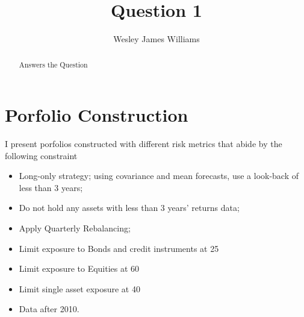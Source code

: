 \documentclass[12pt,preprint, authoryear]{elsarticle}
\numberwithin{equation}{section}
\numberwithin{figure}{section}
\numberwithin{table}{section}
\begin{document}
\begin{frontmatter}  %

\title{Question 1}





\author[Add1]{Wesley James Williams}





\address[Add1]{Stellenbosch University, South Africa}


\begin{abstract}
\small{
Answers the Question
}
\end{abstract}

\vspace{1cm}





\vspace{0.5cm}

\end{frontmatter}

\setcounter{footnote}{0}



\pagestyle{fancy}
\chead{}
\rhead{}
\lfoot{}
\lhead{}
\cfoot{}


\headsep 35pt %




\hypertarget{porfolio-construction}{%
\section{Porfolio Construction}\label{porfolio-construction}}

I present porfolios constructed with different risk metrics that abide
by the following constraint

\begin{itemize}
\item Long-only strategy;
\itemWhen using covariance and mean forecasts, use a look-back of less than 3 years;
\item Do not hold any assets with less than 3 years’ returns data;
\item Apply Quarterly Rebalancing;
\item Limit exposure to Bonds and credit instruments at 25%
\item Limit exposure to Equities at 60%
\item Limit single asset exposure at 40%
\item Data after 2010.
\end{itemize}
\end{document}
